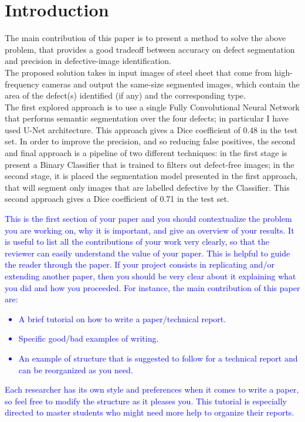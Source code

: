 \documentclass[10pt,twocolumn,letterpaper]{article}
\begin{document}
\section{Introduction}
   The main contribution of this paper is to present a method to solve the above problem, that provides a good tradeoff between accuracy on defect segmentation and precision in defective-image identification. \\
   The proposed solution takes in input images of steel sheet that come from high-frequency cameras and output the same-size segmented images, which contain the area of the defect(s) identified (if any) and the corresponding type. \\
   The first explored approach is to use a single Fully Convolutional Neural Network that performs semantic segmentation over the four defects; in particular I have used U-Net architecture. This approach gives a Dice coefficient of 0.48 in the test set.
   In order to improve the precision, and so reducing false positives, the second and final approach is a pipeline of two different techniques: in the first stage is present a Binary Classifier that is trained to filters out defect-free images; in the second stage, it is placed the segmentation model presented in the first approach, that will segment only images that are labelled defective by the Classifier. This second approach gives a Dice coefficient of 0.71 in the test set. 


   \textcolor{blue}{
   This is the first section of your paper and you should contextualize the problem you are working on, why it is important, and give an overview of your results. It is useful to list all the contributions of your work very clearly, so that the reviewer can easily understand the value of your paper. This is helpful to guide the reader through the paper. If your project consists in replicating and/or extending another paper, then you should be very clear about it explaining what you did and how you proceeded.
   For instance, the main contribution of this paper are: 
   \begin{itemize}
      \item A brief tutorial on how to write a paper/technical report.
      \item Specific good/bad examples of writing.
      \item An example of structure that is suggested to follow for a technical report and can be reorganized as you need.
   \end{itemize}
   Each researcher has its own style and preferences when it comes to write a paper, so feel free to modify the structure as it pleases you. 
   This tutorial is especially directed to master students who might need more help to organize their reports.}
\end{document}
